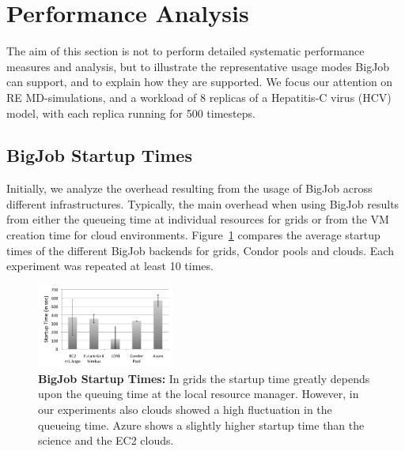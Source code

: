 \documentclass[conference,final]{IEEEtran}
\newcommand{\up}{\vspace*{-1em}}
\newcommand{\numrep}{8 }
\newcommand{\alnote}[1]{ {\textcolor{blue} { ***AL: #1 }}}
\newcommand{\jhanote}[1]{ {\textcolor{red} { ***SJ: #1 }}}
\newcommand{\alnote}[1]{}
\newcommand{\jhanote}[1]{}
\begin{document}


\up
\section{Performance Analysis}
\label{sec:performance}
\up The aim of this section is not to perform detailed systematic
performance measures and analysis, but to illustrate the
representative usage modes BigJob can support, and to explain how they
are supported.  %
We focus our attention on RE MD-simulations, and a workload of \numrep
replicas of a Hepatitis-C virus (HCV) model, with each replica running
for 500 timesteps.  \up

\subsection{BigJob Startup Times}
\up Initially, we analyze the overhead resulting from the usage of
BigJob across different infrastructures. Typically, the main overhead
when using BigJob results from either the queueing time at individual
resources for grids or from the VM creation time for cloud
environments.  Figure~\ref{fig:performance_setup_time} compares the
average startup times of the different BigJob
backends %
for grids, Condor pools and clouds. Each experiment was repeated at
least 10 times.

\begin{figure}[htbp]
    \centering
        \includegraphics[width=0.4\textwidth]{performance/setup-times}
    \caption{\textbf{BigJob Startup Times:} In grids the startup time
      greatly depends upon the queuing time at the local resource
      manager. However, in our experiments also clouds showed a high
      fluctuation in the queueing time. Azure shows a slightly higher
      startup time than the science and the EC2 clouds.\up}
    \label{fig:performance_setup_time}
\end{figure}
\end{document}
